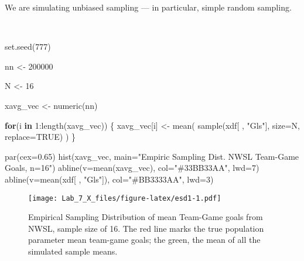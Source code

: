 \documentclass[
]{article}
\newenvironment{Shaded}{\begin{snugshade}}{\end{snugshade}}
\newcommand{\AttributeTok}[1]{\textcolor[rgb]{0.77,0.63,0.00}{#1}}
\newcommand{\ConstantTok}[1]{\textcolor[rgb]{0.00,0.00,0.00}{#1}}
\newcommand{\ControlFlowTok}[1]{\textcolor[rgb]{0.13,0.29,0.53}{\textbf{#1}}}
\newcommand{\DecValTok}[1]{\textcolor[rgb]{0.00,0.00,0.81}{#1}}
\newcommand{\FloatTok}[1]{\textcolor[rgb]{0.00,0.00,0.81}{#1}}
\newcommand{\FunctionTok}[1]{\textcolor[rgb]{0.00,0.00,0.00}{#1}}
\newcommand{\NormalTok}[1]{#1}
\newcommand{\OtherTok}[1]{\textcolor[rgb]{0.56,0.35,0.01}{#1}}
\newcommand{\SpecialCharTok}[1]{\textcolor[rgb]{0.00,0.00,0.00}{#1}}
\newcommand{\StringTok}[1]{\textcolor[rgb]{0.31,0.60,0.02}{#1}}
\begin{document}
We are simulating unbiased sampling --- in particular, simple random
sampling.

~~

\begin{Shaded}
\begin{Highlighting}[]
\FunctionTok{set.seed}\NormalTok{(}\DecValTok{777}\NormalTok{)}

\NormalTok{nn }\OtherTok{\textless{}{-}} \DecValTok{200000}

\NormalTok{N }\OtherTok{\textless{}{-}} \DecValTok{16}

\NormalTok{xavg\_vec }\OtherTok{\textless{}{-}} \FunctionTok{numeric}\NormalTok{(nn)}

\ControlFlowTok{for}\NormalTok{(i }\ControlFlowTok{in} \DecValTok{1}\SpecialCharTok{:}\FunctionTok{length}\NormalTok{(xavg\_vec)) \{}
\NormalTok{    xavg\_vec[i] }\OtherTok{\textless{}{-}} \FunctionTok{mean}\NormalTok{( }\FunctionTok{sample}\NormalTok{(xdf[ , }\StringTok{"Gls"}\NormalTok{], }\AttributeTok{size=}\NormalTok{N, }\AttributeTok{replace=}\ConstantTok{TRUE}\NormalTok{) )}
\NormalTok{\}}
\end{Highlighting}
\end{Shaded}

\begin{Shaded}
\begin{Highlighting}[]
\FunctionTok{par}\NormalTok{(}\AttributeTok{cex=}\FloatTok{0.65}\NormalTok{)}
\FunctionTok{hist}\NormalTok{(xavg\_vec, }\AttributeTok{main=}\StringTok{"Empiric Sampling Dist. NWSL Team{-}Game Goals, n=16"}\NormalTok{)}
\FunctionTok{abline}\NormalTok{(}\AttributeTok{v=}\FunctionTok{mean}\NormalTok{(xavg\_vec), }\AttributeTok{col=}\StringTok{"\#33BB33AA"}\NormalTok{, }\AttributeTok{lwd=}\DecValTok{7}\NormalTok{)}
\FunctionTok{abline}\NormalTok{(}\AttributeTok{v=}\FunctionTok{mean}\NormalTok{(xdf[ , }\StringTok{"Gls"}\NormalTok{]), }\AttributeTok{col=}\StringTok{"\#BB3333AA"}\NormalTok{, }\AttributeTok{lwd=}\DecValTok{3}\NormalTok{)}
\end{Highlighting}
\end{Shaded}

\begin{figure}
\centering
\texttt{[image: Lab\_7\_X\_files/figure-latex/esd1-1.pdf]}
\caption{Empirical Sampling Distribution of mean Team-Game goals from
NWSL, sample size of 16. The red line marks the true population
parameter mean team-game goals; the green, the mean of all the simulated
sample means.}
\end{figure}
\end{document}
